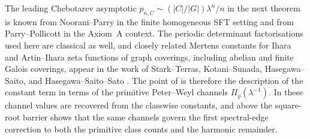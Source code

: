 \begin{remark}
  \label{rem:chebotarev-known-vs-new}
  The leading Chebotarev asymptotic
  \(p_{n,C}\sim(|C|/|G|)\lambda^n/n\) in the next theorem is known
  from Noorani--Parry \cite{NooraniParry1992ChebotarevShifts} in the
  finite homogeneous SFT setting and from Parry--Pollicott
  \cite{ParryPollicott1986Chebotarev} in the Axiom~A context.
  The periodic determinant factorisations used here are classical as
  well, and closely related Mertens constants for Ihara and Artin--Ihara
  zeta functions of graph coverings, including abelian and finite Galois
  coverings, appear in the work of
  Stark--Terras, Kotani--Sunada, Hasegawa--Saito, and
  Hasegawa--Saito--Sato
  \cite{KotaniSunada2000ZetaFiniteGraphs,StarkTerras1996ZetaGraphCoverings,StarkTerras2000ZetaGraphCoveringsII,TerrasStark2007ZetaGraphCoveringsIII,HasegawaSaito2016GraphMertens,HasegawaSaitoSato2015AbelianCovering,HasegawaSaitoSato2018GaloisCovering}.
  The point of  is therefore the
  description of the constant term in terms of the primitive
  Peter--Weyl channels \(\Pi_\varrho(\lambda^{-1})\). In
   these channel values are recovered
  from the classwise constants, and above the square-root barrier
   shows that the same channels
  govern the first spectral-edge correction to both the primitive class
  counts and the harmonic remainder.
\end{remark}

